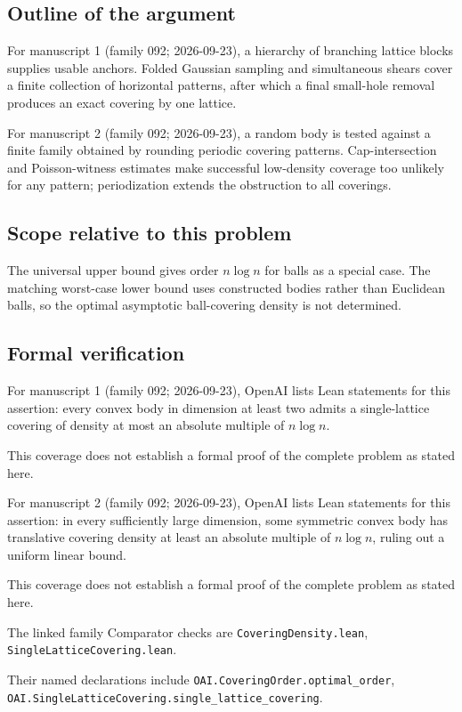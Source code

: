 \documentclass[11pt]{article}
\begin{document}
\subsection{Outline of the argument}
For manuscript 1 (family 092; 2026-09-23), a hierarchy of branching lattice blocks supplies usable anchors. Folded Gaussian sampling and simultaneous shears cover a finite collection of horizontal patterns, after which a final small-hole removal produces an exact covering by one lattice.

For manuscript 2 (family 092; 2026-09-23), a random body is tested against a finite family obtained by rounding periodic covering patterns. Cap-intersection and Poisson-witness estimates make successful low-density coverage too unlikely for any pattern; periodization extends the obstruction to all coverings.

\subsection{Scope relative to this problem}
The universal upper bound gives order $n\log n$ for balls as a special case. The matching worst-case lower bound uses constructed bodies rather than Euclidean balls, so the optimal asymptotic ball-covering density is not determined.

\subsection{Formal verification}
For manuscript 1 (family 092; 2026-09-23), OpenAI lists Lean statements for this assertion: every convex body in dimension at least two admits a single-lattice covering of density at most an absolute multiple of $n\log n$.

This coverage does not establish a formal proof of the complete problem as stated here.

For manuscript 2 (family 092; 2026-09-23), OpenAI lists Lean statements for this assertion: in every sufficiently large dimension, some symmetric convex body has translative covering density at least an absolute multiple of $n\log n$, ruling out a uniform linear bound.

This coverage does not establish a formal proof of the complete problem as stated here.

The linked family Comparator checks are \texttt{CoveringDensity.lean}, \texttt{SingleLatticeCovering.lean}.

Their named declarations include \texttt{OAI.CoveringOrder.optimal\_order}, \texttt{OAI.SingleLatticeCovering.single\_lattice\_covering}.
\end{document}
